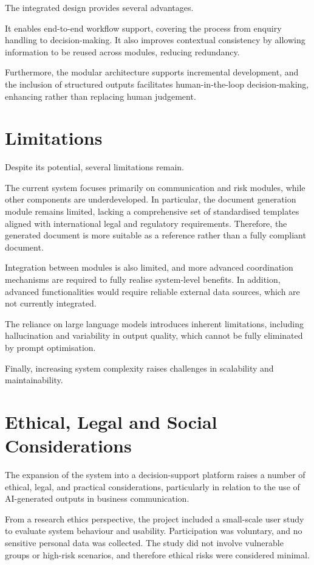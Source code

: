 \documentclass[12pt,a4paper]{report}
\begin{document}
The integrated design provides several advantages.

It enables end-to-end workflow support, covering the process from enquiry handling to decision-making. It also improves contextual consistency by allowing information to be reused across modules, reducing redundancy.

Furthermore, the modular architecture supports incremental development, and the inclusion of structured outputs facilitates human-in-the-loop decision-making, enhancing rather than replacing human judgement.

\section{Limitations}

Despite its potential, several limitations remain.

The current system focuses primarily on communication and risk modules, while other components are underdeveloped. In particular, the document generation module remains limited, lacking a comprehensive set of standardised templates aligned with international legal and regulatory requirements. Therefore, the generated document is more suitable as a reference rather than a fully compliant document.

Integration between modules is also limited, and more advanced coordination mechanisms are required to fully realise system-level benefits. In addition, advanced functionalities would require reliable external data sources, which are not currently integrated.

The reliance on large language models introduces inherent limitations, including hallucination and variability in output quality, which cannot be fully eliminated by prompt optimisation.

Finally, increasing system complexity raises challenges in scalability and maintainability.

\section{Ethical, Legal and Social Considerations}

The expansion of the system into a decision-support platform raises a number of ethical, legal, and practical considerations, particularly in relation to the use of AI-generated outputs in business communication.

From a research ethics perspective, the project included a small-scale user study to evaluate system behaviour and usability. Participation was voluntary, and no sensitive personal data was collected. The study did not involve vulnerable groups or high-risk scenarios, and therefore ethical risks were considered minimal.
\end{document}

